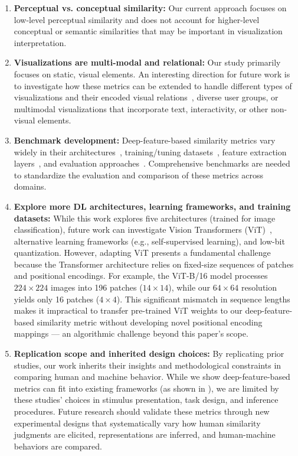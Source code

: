 \documentclass[sigconf]{acmart}
\begin{document}
\begin{enumerate}
    \item \textbf{Perceptual vs. conceptual similarity:} Our current approach focuses on low-level perceptual similarity and does not account for higher-level conceptual or semantic similarities \cite{pandey2016towards} that may be important in visualization interpretation.  
    \item \textbf{Visualizations are multi-modal and relational:} Our study primarily focuses on static, visual elements. An interesting direction for future work is to investigate how these metrics can be extended to handle different types of visualizations and their encoded visual relations~\cite{haehnEvaluatingGraphicalPerception2019, fleuret2011comparing, kim2018not}, diverse user groups, or multimodal visualizations that incorporate text, interactivity, or other non-visual elements. 
    \item \textbf{Benchmark development:} Deep-feature-based similarity metrics vary widely in their architectures~\cite{zhangUnreasonableEffectivenessDeep2018, kumarBetterImageNetClassifiers2022}, training/tuning datasets~\cite{dingImageQualityAssessment2020}, feature extraction layers~\cite{pihlgren2023systematic}, and evaluation approaches~\cite{sucholutsky2023getting}. Comprehensive benchmarks are needed to standardize the evaluation and comparison of these metrics across domains.
    \item \textbf{Explore more DL architectures, learning frameworks, and training datasets:} While this work explores five architectures (trained for image classification), future work can investigate Vision Transformers (ViT)~\cite{vaswani2017attention}, alternative learning frameworks (e.g., self-supervised learning), and low-bit quantization. However, adapting ViT presents a fundamental challenge because the Transformer architecture relies on fixed-size sequences of patches and positional encodings. For example, the ViT-B/16 model processes $224 \times 224$ images into 196 patches ($14 \times 14$), while our $64 \times 64$ resolution yields only 16 patches ($4 \times 4$). This significant mismatch in sequence lengths makes it impractical to transfer pre-trained ViT weights to our deep-feature-based similarity metric without developing novel positional encoding mappings --- an algorithmic challenge beyond this paper's scope.
    \item \textbf{Replication scope and inherited design choices:} By replicating prior studies, our work inherits their insights and methodological constraints in comparing human and machine behavior. While we show deep-feature-based metrics can fit into existing frameworks (as shown in ), we are limited by these studies' choices in stimulus presentation, task design, and inference procedures. Future research should validate these metrics through new experimental designs that systematically vary how human similarity judgments are elicited, representations are inferred, and human-machine behaviors are compared.
\end{enumerate}
\end{document}
